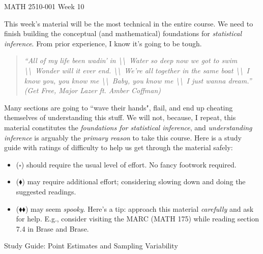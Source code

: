 \documentclass[11pt]{article}
\newcommand{\bs}{$\square$}
\newcommand{\bd}{$\blacklozenge$}
\newcommand{\dbd}{$\blacklozenge\blacklozenge$}
\begin{document}
\noindent
{\LARGE {MATH 2510-001 \hfill Week 10}}

This week's material will be the most technical in the entire course. We need to finish building the conceptual (and mathematical) foundations for \emph{statistical inference}. From prior experience, I know it's going to be tough.

\begin{quote}
\textit{%
    ``All of my life been wadin' in \textbackslash \textbackslash\ Water so deep now we got to swim \textbackslash\textbackslash\ Wonder will it ever end. \textbackslash\textbackslash\ We're all together in the same boat \textbackslash\textbackslash\ I know you, you know me \textbackslash\textbackslash\  Baby, you know me \textbackslash\textbackslash\ I just wanna dream.'' (Get Free, Major Lazer ft. Amber Coffman) }
\end{quote}

Many sections are going to ``wave their hands", flail, and end up cheating themselves of understanding this stuff. We will not, because, I repeat, this material constitutes the \emph{foundations for statistical inference}, and \emph{understanding inference} is arguably the \emph{primary reason} to take this course. Here is a study guide with ratings of difficulty to help us get through the material safely:

\begin{itemize}
    \item (\bs) should require the usual level of effort. No fancy footwork required.
    \item (\bd) may require additional effort; considering slowing down and doing the suggested readings.
    \item (\dbd) may seem \emph{spooky}. Here's a tip: approach this material \emph{carefully} and ask for help. E.g., consider visiting the MARC (MATH 175) while reading section 7.4 in Brase and Brase.
\end{itemize}

\noindent
{\Large Study Guide: Point Estimates and Sampling Variability}
%
\end{document}
